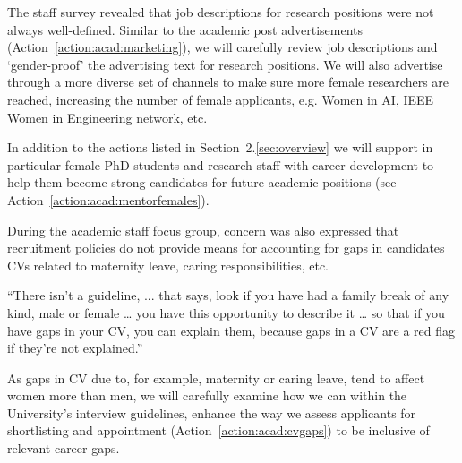 %

The staff survey revealed that job descriptions for research positions were not always well-defined. Similar to the academic post advertisements (Action~\ref{action:acad:marketing}), we will carefully review job descriptions and `gender-proof' the advertising text for research positions.
We will also advertise through a more diverse set of channels to make sure more female researchers are reached, increasing the number of female applicants, e.g. Women in AI, IEEE Women in Engineering network, etc.

In addition to the actions listed in Section~2.\ref{sec:overview} 
we will support in particular female PhD students and research staff with career development to help them become strong candidates for future academic positions (see Action~\ref{action:acad:mentorfemales}).




During the academic staff focus group, concern was also expressed that recruitment policies do not provide means for accounting for gaps in candidates CVs related to maternity leave, caring responsibilities, etc. 

\begin{myquote}
``There isn’t a guideline, ... that says, look if you have had a family break of any kind, male or female … you have this opportunity to describe it … so that if you have gaps in your CV, you can explain them, because gaps in a CV are a red flag if they're not explained.''
\end{myquote}

As gaps in CV due to, for example, maternity or caring leave, tend to affect women more than men, we will carefully examine how we can within the University's interview guidelines, enhance the way we assess applicants for shortlisting and appointment (Action~\ref{action:acad:cvgaps}) to be inclusive of relevant career gaps.


